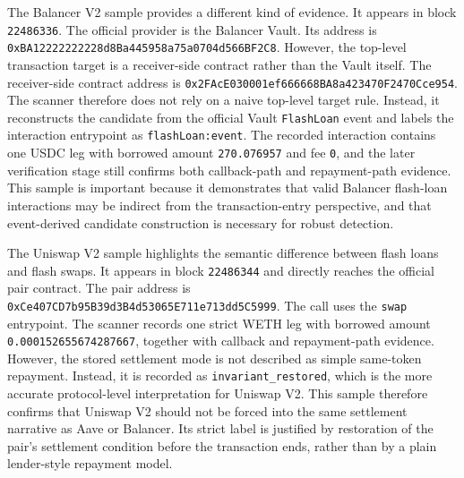 The Balancer V2 sample provides a different kind of evidence. It appears in block \texttt{22486336}. The official provider is the Balancer Vault. Its address is \texttt{0xBA12222222228d8B\allowbreak{}a445958a75a0704d\allowbreak{}566BF2C8}. However, the top-level transaction target is a receiver-side contract rather than the Vault itself. The receiver-side contract address is \texttt{0x2FAcE03000\allowbreak{}1ef666668B\allowbreak{}A8a423470F\allowbreak{}2470Cce954}. The scanner therefore does not rely on a naive top-level target rule. Instead, it reconstructs the candidate from the official Vault \texttt{FlashLoan} event and labels the interaction entrypoint as \texttt{flashLoan:event}. The recorded interaction contains one USDC leg with borrowed amount \texttt{270.076957} and fee \texttt{0}, and the later verification stage still confirms both callback-path and repayment-path evidence. This sample is important because it demonstrates that valid Balancer flash-loan interactions may be indirect from the transaction-entry perspective, and that event-derived candidate construction is necessary for robust detection.

The Uniswap V2 sample highlights the semantic difference between flash loans and flash swaps. It appears in block \texttt{22486344} and directly reaches the official pair contract. The pair address is \texttt{0xCe407CD7b95B39d3\allowbreak{}B4d53065E711e713\allowbreak{}dd5C5999}. The call uses the \texttt{swap} entrypoint. The scanner records one strict WETH leg with borrowed amount \texttt{0.000152655674287667}, together with callback and repayment-path evidence. However, the stored settlement mode is not described as simple same-token repayment. Instead, it is recorded as \texttt{invariant\allowbreak{}\_restored}, which is the more accurate protocol-level interpretation for Uniswap V2. This sample therefore confirms that Uniswap V2 should not be forced into the same settlement narrative as Aave or Balancer. Its strict label is justified by restoration of the pair's settlement condition before the transaction ends, rather than by a plain lender-style repayment model.
